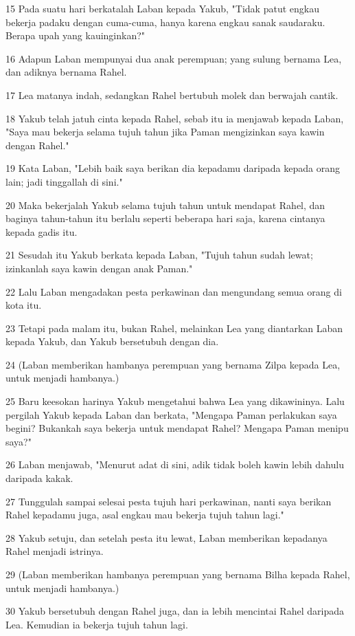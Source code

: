 \par 15 Pada suatu hari berkatalah Laban kepada Yakub, "Tidak patut engkau bekerja padaku dengan cuma-cuma, hanya karena engkau sanak saudaraku. Berapa upah yang kauinginkan?"
\par 16 Adapun Laban mempunyai dua anak perempuan; yang sulung bernama Lea, dan adiknya bernama Rahel.
\par 17 Lea matanya indah, sedangkan Rahel bertubuh molek dan berwajah cantik.
\par 18 Yakub telah jatuh cinta kepada Rahel, sebab itu ia menjawab kepada Laban, "Saya mau bekerja selama tujuh tahun jika Paman mengizinkan saya kawin dengan Rahel."
\par 19 Kata Laban, "Lebih baik saya berikan dia kepadamu daripada kepada orang lain; jadi tinggallah di sini."
\par 20 Maka bekerjalah Yakub selama tujuh tahun untuk mendapat Rahel, dan baginya tahun-tahun itu berlalu seperti beberapa hari saja, karena cintanya kepada gadis itu.
\par 21 Sesudah itu Yakub berkata kepada Laban, "Tujuh tahun sudah lewat; izinkanlah saya kawin dengan anak Paman."
\par 22 Lalu Laban mengadakan pesta perkawinan dan mengundang semua orang di kota itu.
\par 23 Tetapi pada malam itu, bukan Rahel, melainkan Lea yang diantarkan Laban kepada Yakub, dan Yakub bersetubuh dengan dia.
\par 24 (Laban memberikan hambanya perempuan yang bernama Zilpa kepada Lea, untuk menjadi hambanya.)
\par 25 Baru keesokan harinya Yakub mengetahui bahwa Lea yang dikawininya. Lalu pergilah Yakub kepada Laban dan berkata, "Mengapa Paman perlakukan saya begini? Bukankah saya bekerja untuk mendapat Rahel? Mengapa Paman menipu saya?"
\par 26 Laban menjawab, "Menurut adat di sini, adik tidak boleh kawin lebih dahulu daripada kakak.
\par 27 Tunggulah sampai selesai pesta tujuh hari perkawinan, nanti saya berikan Rahel kepadamu juga, asal engkau mau bekerja tujuh tahun lagi."
\par 28 Yakub setuju, dan setelah pesta itu lewat, Laban memberikan kepadanya Rahel menjadi istrinya.
\par 29 (Laban memberikan hambanya perempuan yang bernama Bilha kepada Rahel, untuk menjadi hambanya.)
\par 30 Yakub bersetubuh dengan Rahel juga, dan ia lebih mencintai Rahel daripada Lea. Kemudian ia bekerja tujuh tahun lagi.
